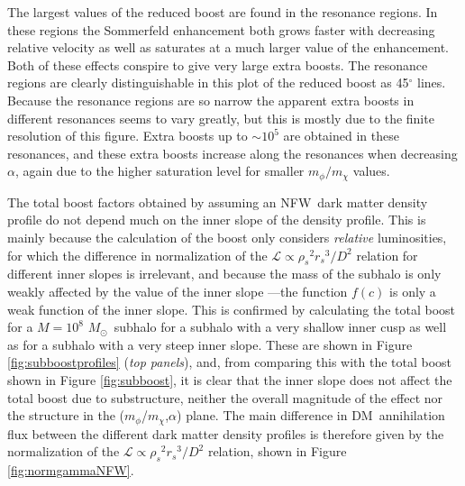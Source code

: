 \documentclass[aps,prd,twocolumn,amsmath,amssymb,floatfix,nofootinbib,10pt]{revtex4}
\newcommand{\NFW}{NFW}
\newcommand{\DM}{DM}
\newcommand{\mdm}{\ensuremath{m_{\chi}}}
\newcommand{\mv}{\ensuremath{m_{\phi}}}
\newcommand{\lum}{\ensuremath{\mathcal{L}}}
\newcommand{\rhos}{\ensuremath{\rho_s}}
\newcommand{\rs}{\ensuremath{r_s}}
\newcommand{\dist}{\ensuremath{D}}
\newcommand{\Msol}{\ensuremath{M_{\odot}}}
\newcommand{\Msun}{\Msol}
\newcommand{\degree}{^\circ}
\begin{document}
The largest values of the reduced boost are found in the resonance
regions. In these regions the Sommerfeld enhancement both grows faster
with decreasing relative velocity as well as saturates at a much
larger value of the enhancement. Both of these effects conspire to
give very large extra boosts. The resonance regions are clearly
distinguishable in this plot of the reduced boost as 45$\degree$
lines. Because the resonance regions are so narrow the apparent extra
boosts in different resonances seems to vary greatly, but this is
mostly due to the finite resolution of this figure. Extra boosts up to
$\sim 10^5$ are obtained in these resonances, and these extra boosts
increase along the resonances when decreasing $\alpha$, again due to
the higher saturation level for smaller $\mv/\mdm$ values.



The total boost factors obtained by assuming an \NFW\ dark matter
density profile do not depend much on the inner slope of the density
profile. This is mainly because the calculation of the boost only
considers \emph{relative} luminosities, for which the difference in
normalization of the $\lum \propto \rhos^2 \rs^3/\dist^2$ relation for
different inner slopes is irrelevant, and because the mass of the
subhalo is only weakly affected by the value of the inner slope ---the
function $f(c)$ is only a weak function of the inner slope. This is
confirmed by calculating the total boost for a $M = 10^8$ \Msun\
subhalo for a subhalo with a very shallow inner cusp as well as for a
subhalo with a very steep inner slope. These are shown in Figure
\ref{fig:subboostprofiles} (\emph{top panels}), and, from comparing
this with the total boost shown in Figure \ref{fig:subboost}, it is
clear that the inner slope does not affect the total boost due to
substructure, neither the overall magnitude of the effect nor the
structure in the (\mv/\mdm,$\alpha$) plane. The main difference in
\DM\ annihilation flux between the different dark matter density
profiles is therefore given by the normalization of the $\lum \propto
\rhos^2 \rs^3/\dist^2$ relation, shown in Figure
\ref{fig:normgammaNFW}.
\end{document}
